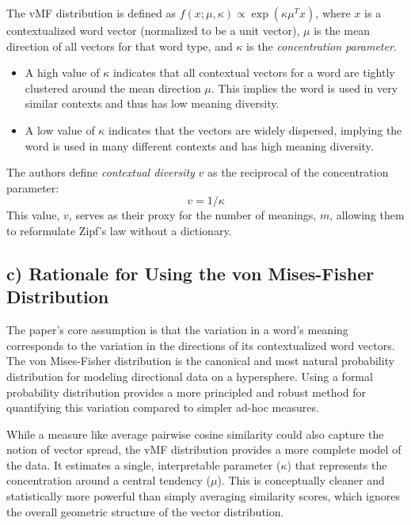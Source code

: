 \documentclass{solutionclass} %
\begin{document}
The vMF distribution is defined as $f(x; \mu, \kappa) \propto \exp(\kappa\mu^T x)$, where $x$ is a contextualized word vector (normalized to be a unit vector), $\mu$ is the mean direction of all vectors for that word type, and $\kappa$ is the \emph{concentration parameter}.
\begin{itemize}
    \item A high value of $\kappa$ indicates that all contextual vectors for a word are tightly clustered around the mean direction $\mu$. This implies the word is used in very similar contexts and thus has low meaning diversity.
    \item A low value of $\kappa$ indicates that the vectors are widely dispersed, implying the word is used in many different contexts and has high meaning diversity.
\end{itemize}
The authors define \emph{contextual diversity} $v$ as the reciprocal of the concentration parameter:
\begin{equation}
    v = 1/\kappa
\end{equation}
This value, $v$, serves as their proxy for the number of meanings, $m$, allowing them to reformulate Zipf's law without a dictionary.

\subsection{c) Rationale for Using the von Mises-Fisher Distribution}
The paper's core assumption is that the variation in a word's meaning corresponds to the variation in the directions of its contextualized word vectors. The von Mises-Fisher distribution is the canonical and most natural probability distribution for modeling directional data on a hypersphere. Using a formal probability distribution provides a more principled and robust method for quantifying this variation compared to simpler ad-hoc measures.

While a measure like average pairwise cosine similarity could also capture the notion of vector spread, the vMF distribution provides a more complete model of the data. It estimates a single, interpretable parameter ($\kappa$) that represents the concentration around a central tendency ($\mu$). This is conceptually cleaner and statistically more powerful than simply averaging similarity scores, which ignores the overall geometric structure of the vector distribution.
\end{document}
